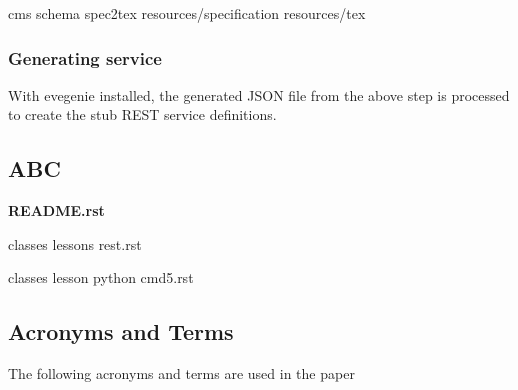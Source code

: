 \documentclass[10pt]{article}
\begin{document}
cms schema spec2tex resources/specification resources/tex

\subsubsection{Generating service}

With evegenie installed, the generated JSON file from the above step
is processed to create the stub REST service definitions.


\subsection{ABC}
{\bf README.rst}

classes lessons rest.rst

classes lesson python cmd5.rst


\subsection{Acronyms and Terms}

The following acronyms and terms are used in the paper
\end{document}
